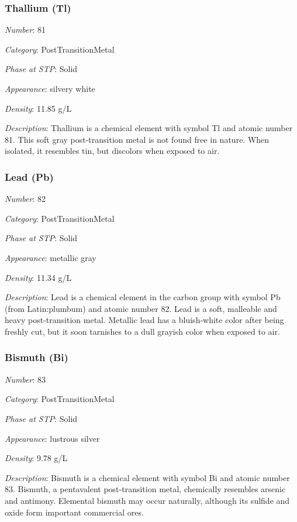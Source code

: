 \documentclass{article}
\begin{document}
\hypertarget{subsubsection::Tl}{}\subsubsection{Thallium (Tl)}

\textit{Number}: 81

\textit{Category}: PostTransitionMetal

\textit{Phase at STP}: Solid

\textit{Appearance}: silvery white

\textit{Density}: 11.85 g/L

\textit{Description}: Thallium is a chemical element with symbol Tl and atomic number 81. This soft gray post-transition metal is not found free in nature. When isolated, it resembles tin, but discolors when exposed to air.

\hypertarget{subsubsection::Pb}{}\subsubsection{Lead (Pb)}

\textit{Number}: 82

\textit{Category}: PostTransitionMetal

\textit{Phase at STP}: Solid

\textit{Appearance}: metallic gray

\textit{Density}: 11.34 g/L

\textit{Description}: Lead is a chemical element in the carbon group with symbol Pb (from Latin:plumbum) and atomic number 82. Lead is a soft, malleable and heavy post-transition metal. Metallic lead has a bluish-white color after being freshly cut, but it soon tarnishes to a dull grayish color when exposed to air.

\hypertarget{subsubsection::Bi}{}\subsubsection{Bismuth (Bi)}

\textit{Number}: 83

\textit{Category}: PostTransitionMetal

\textit{Phase at STP}: Solid

\textit{Appearance}: lustrous silver

\textit{Density}: 9.78 g/L

\textit{Description}: Bismuth is a chemical element with symbol Bi and atomic number 83. Bismuth, a pentavalent post-transition metal, chemically resembles arsenic and antimony. Elemental bismuth may occur naturally, although its sulfide and oxide form important commercial ores.
\end{document}
